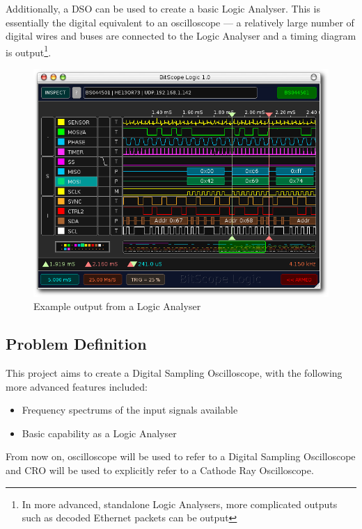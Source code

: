 Additionally, a DSO can be used to create a basic Logic Analyser. This is
essentially the digital equivalent to an oscilloscope --- a relatively large
number of digital wires and buses are connected to the Logic Analyser and a
timing diagram is output\footnote{In more advanced, standalone Logic Analysers,
more complicated outputs such as decoded Ethernet packets can be
output}.~\autocite{ElectronicDesignMSO}

\begin{figure}
  \includegraphics[width=\linewidth]{img/bitscope.png}
  \caption[Logic Analyser Example Output]{Example output from a Logic Analyser ~\autocite{fig:Bitscope}}
\end{figure}

\subsection*{Problem Definition}

This project aims to create a Digital Sampling Oscilloscope, with the following
more advanced features included:

\begin{itemize}
  \item Frequency spectrums of the input signals available
  \item Basic capability as a Logic Analyser
\end{itemize}

From now on, oscilloscope will be used to refer to a Digital Sampling
Oscilloscope and CRO will be used to explicitly refer to a Cathode Ray
Oscilloscope.

